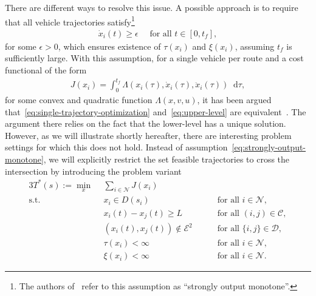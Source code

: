 \documentclass[a4paper]{report}
\theoremstyle{definition}
\theoremstyle{plain}
\newcommand*\diff{\mathop{}\!\mathrm{d}}
\begin{document}
There are different ways to resolve this issue. A possible approach is to
require that all vehicle trajectories satisfy\footnote{The authors
  of~\cite{hultApproximateSolutionOptimal2015} refer to this assumption as ``strongly
  output monotone''.}
\begin{align}\label{eq:strongly-output-monotone}
  \dot{x}_{i}(t) \geq \epsilon \quad \text{ for all } t \in [0, t_{f}] ,
\end{align}
for some $\epsilon > 0$, which ensures
existence of $\tau(x_{i})$ and $\xi(x_{i})$, assuming $t_{f}$ is sufficiently large.
%
With this assumption, for a single vehicle per route and a cost functional of
the form
\begin{align}
  J(x_{i}) = \int_{0}^{t_{f}} \Lambda(x_{i}(\tau), \dot{x}_{i}(\tau), \ddot{x}_{i}(\tau)) \diff \tau ,
\end{align}
for some convex and quadratic function $\Lambda(x,v,u)$, it has been argued that~\eqref{eq:single-trajectory-optimization}
and~\eqref{eq:upper-level} are equivalent~\cite[Theorem 1]{hultTechnicalReportApproximate}.
%
The argument there relies on the fact that the lower-level has a unique
solution. However, as we will illustrate shortly hereafter, there are
interesting problem settings for which this does not hold.
%
Instead of assumption~\eqref{eq:strongly-output-monotone}, we will explicitly restrict the set feasible
trajectories to cross the intersection by introducing the problem variant
\begin{alignat}{3}\label{eq:T*}
  T^{*}(s) := \min_{x} \;\, & \sum_{i \in \mathcal{N}} J(x_{i}) \tag{T*} \\
  \text{s.t. } \; & x_{i} \in D(s_{i}) && \quad \text{ for all } i \in \mathcal{N} , \tag{T.1} \\
           & x_{i}(t) - x_{j}(t) \geq L && \quad \text{ for all } (i,j) \in \mathcal{C} , \tag{T.2} \\
           & (x_{i}(t), x_{j}(t)) \notin \mathcal{E}^{2} && \quad\text{ for all } \{i, j\} \in \mathcal{D} , \tag{T.3} \label{eq:T*.3} \\
           & \tau(x_{i}) < \infty && \quad \text{ for all } i \in \mathcal{N} , \tag{T*.4} \label{eq:T4*} \\
           & \xi(x_{i}) < \infty && \quad  \text{ for all } i \in \mathcal{N} . \tag{T*.5} \label{eq:T5*}
\end{alignat}
\end{document}
